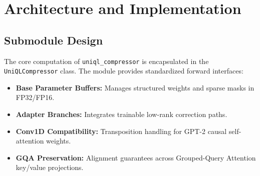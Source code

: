 \section{Architecture and Implementation}

\subsection{Submodule Design}
The core computation of \texttt{uniql_compressor} is encapsulated in the \texttt{UniQLCompressor} class. The module provides standardized forward interfaces:
\begin{itemize}
\item \textbf{Base Parameter Buffers:} Manages structured weights and sparse masks in FP32/FP16.
\item \textbf{Adapter Branches:} Integrates trainable low-rank correction paths.
\item \textbf{Conv1D Compatibility:} Transposition handling for GPT-2 causal self-attention weights.
\item \textbf{GQA Preservation:} Alignment guarantees across Grouped-Query Attention key/value projections.
\end{itemize}
